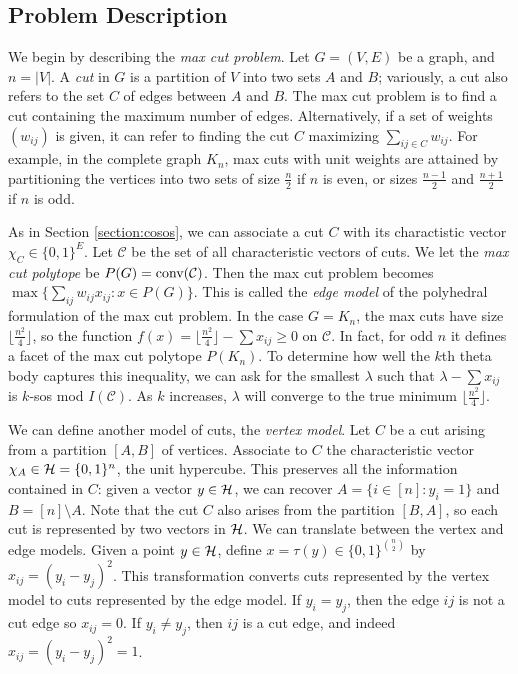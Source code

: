 \subsection{Problem Description}
We begin by describing the {\em max cut problem}.
Let $G=(V,E)$ be a graph, and $n = |V|$.
A {\em cut} in $G$ is a partition of $V$ into two sets $A$ and $B$; variously, a cut also refers to the set $C$ of edges between $A$ and $B$.
The max cut problem is to find a cut containing the maximum number of edges.
Alternatively, if a set of weights $(w_{ij})$ is given, it can refer to finding the cut $C$ maximizing $\sum_{ij \in C} w_{ij}$.
For example, in the complete graph $K_n$, max cuts with unit weights are attained by partitioning the vertices into two sets of size $\frac{n}{2}$ if $n$ is even, or sizes $\frac{n-1}{2}$ and $\frac{n+1}{2}$ if $n$ is odd.

As in Section \ref{section:cosos}, we can associate a cut $C$ with its charactistic vector $\chi_C \in \{0,1\}^E$.
Let $\mathcal{C}$ be the set of all characteristic vectors of cuts.
We let the {\em max cut polytope} be $P(G) = \hbox{conv} (\mathcal{C})$.
Then the max cut problem becomes $\max \{\sum_{ij} w_{ij}x_{ij}: x \in P(G) \}$.
This is called the {\em edge model} of the polyhedral formulation of the max cut problem.
In the case $G = K_n$, the max cuts have size $\lfloor \frac{n^2}{4} \rfloor$, so the function $f(x) = \lfloor \frac{n^2}{4} \rfloor - \sum x_{ij} \ge 0$ on $\mathcal{C}$.
In fact, for odd $n$ it defines a facet of the max cut polytope $P(K_n)$.
To determine how well the $k$th theta body captures this inequality, we can ask for the smallest $\lambda$ such that $\lambda - \sum x_{ij}$ is $k$-sos mod $I(\mathcal{C})$.
As $k$ increases, $\lambda$ will converge to the true minimum $\lfloor \frac{n^2}{4} \rfloor$.

We can define another model of cuts, the {\em vertex model}. 
Let $C$ be a cut arising from a partition $[A,B]$ of vertices.
Associate to $C$ the characteristic vector $\chi_A \in \mathcal{H} = \{0,1\}^n$, the unit hypercube.
This preserves all the information contained in $C$: given a vector $y \in \mathcal{H}$, we can recover $A = \{i \in [n]: y_i = 1\}$ and $B = [n] \setminus A$.
Note that the cut $C$ also arises from the partition $[B,A]$, so each cut is represented by two vectors in $\mathcal{H}$.
We can translate between the vertex and edge models.
Given a point $y \in \mathcal{H}$, define $x = \tau(y)\in \{0,1\}^{n \choose 2}$ by $x_{ij} = (y_i - y_j)^2$.
This transformation converts cuts represented by the vertex model to cuts represented by the edge model. If $y_i = y_j$, then the edge $ij$ is not a cut edge so $x_{ij}=0$.
If $y_i \ne y_j$, then $ij$ is a cut edge, and indeed $x_{ij} = (y_i-y_j)^2 = 1$.

